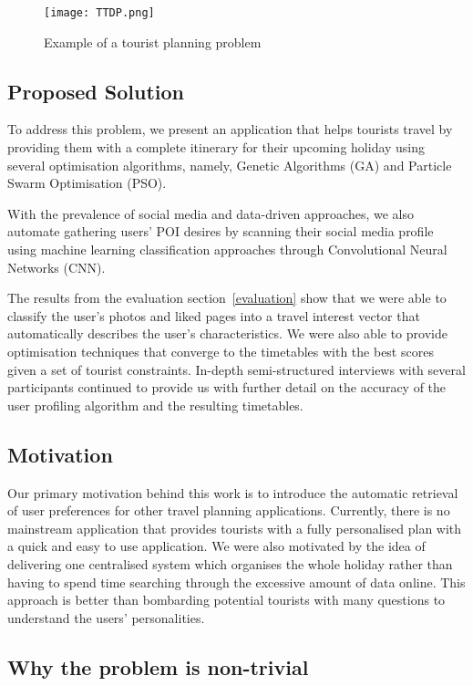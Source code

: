 \begin{figure}[h]
\centering
\texttt{[image: TTDP.png]}
\caption{Example of a tourist planning problem}
\label{TTDP}
\end{figure}

\subsection{Proposed Solution}

To address this problem, we present an application
that helps tourists travel by providing them with a
complete itinerary for their upcoming holiday using
several optimisation algorithms, namely, Genetic
Algorithms (GA) and Particle Swarm Optimisation (PSO).

With the prevalence of social media and data-driven
approaches, we also automate gathering users' POI
desires by scanning their social media profile using
machine learning classification approaches through
Convolutional Neural Networks (CNN).

The results from the evaluation section~\ref{evaluation}
show that we were able to classify the user's photos
and liked pages into a travel interest vector that automatically
describes the user's characteristics. We were also able to provide optimisation
techniques that converge to the timetables with the
best scores given a set of tourist constraints.
In-depth semi-structured interviews with several
participants continued to provide us with further
detail on the accuracy of the user profiling algorithm
and the resulting timetables. 

\subsection{Motivation}

Our primary motivation behind this work is to
introduce the automatic retrieval of user preferences
for other travel planning applications. Currently,
there is no mainstream application that provides
tourists with a fully personalised plan with a quick
and easy to use application.  We were also motivated
by the idea of delivering one centralised system which
organises the whole holiday rather than having to
spend time searching through the excessive amount of
data online. This approach is better than bombarding
potential tourists with many questions to understand
the users' personalities.

\subsection{Why the problem is non-trivial}

